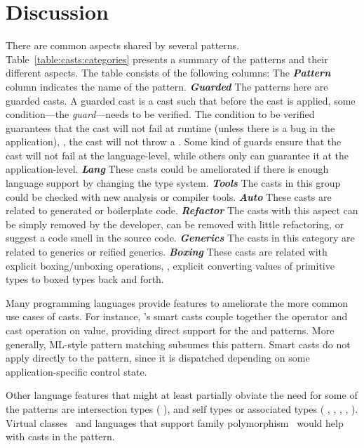 \section{Discussion}\label{sec:casts:discussion}



\newcommand{\gh}[1]{\emph{\textbf{#1}}}

There are common aspects shared by several patterns.
Table~\ref{table:casts:categories} presents a summary of the patterns and their different aspects.
The table consists of the following columns:
The \gh{Pattern} column indicates the name of the pattern.
\gh{Guarded} The patterns here are guarded casts.
A guarded cast is a cast such that before the cast is applied,
some condition---the \emph{guard}---needs to be verified.
The condition to be verified guarantees that the cast will not fail at runtime (unless there is a bug in the application), \ie,
the cast will not throw a .
Some kind of guards ensure that the cast will not fail at the language-level,
while others only can guarantee it at the application-level.
\gh{Lang} These casts could be ameliorated if there is enough language support by changing the type system.
\gh{Tools} The casts in this group could be checked with new analysis or compiler tools.
\gh{Auto} These casts are related to generated or boilerplate code.
\gh{Refactor} The casts with this aspect can be simply removed by the developer,
can be removed with little refactoring,
or suggest a code smell in the source code.
\gh{Generics} The casts in this category are related to generics or reified generics.
\gh{Boxing} These casts are related with explicit boxing/unboxing operations, \ie{},
explicit converting values of primitive types to boxed types back and forth.

Many programming languages provide features to ameliorate the more common use cases of casts.
For instance,
\kotlin{}'s smart casts couple together the  operator and cast operation on value, 
providing direct support for the  and  patterns.
More generally, ML-style pattern matching subsumes this pattern.
Smart casts do not apply directly to the  pattern,
since it is dispatched depending on some application-specific control state.

Other language features that might at least partially obviate the need for some of the patterns are
intersection types (\cf{} ),
and self types or associated types (\cf{} 
,
,
,
,
).
Virtual classes~\citep{gbeta, scalaIndependentlyExtensible} and languages that support family polymorphism~\citep{ernstFamilyPolymorphism2001}
would help with casts in the  pattern.

